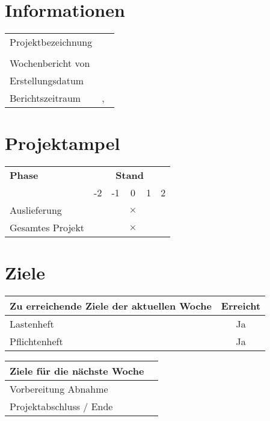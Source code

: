 
\section*{Informationen}

\begin{tabularx}{\textwidth}{lX}
\arrayrulecolor{OliveGreen}
\toprule[2pt]
Projektbezeichnung	         	& \projecttitle            	\\
         						& 								\\ \midrule
Wochenbericht von				& \writer                     			\\ \midrule
Erstellungsdatum				& \datum                             		\\ \midrule
Berichtszeitraum				& \berichtsdatum,~\KW							\\
\bottomrule[2pt]
\end{tabularx}

\section*{Projektampel}

\begin{tabularx}{\textwidth}{Xccccc}
\arrayrulecolor{OliveGreen}
\toprule
{\bfseries Phase} 	 & \multicolumn{5}{c}{\bfseries Stand} 			\\ 
\cmidrule(l){2-6}
				 &	-2             & -1                 & 0                       & 1                    & 2		\\
\midrule[2pt]
Auslieferung     & \cellcolor{red} & \cellcolor{red!40} & \cellcolor{green!10}	$\times$ & \cellcolor{green!40} & \cellcolor{green}      \\ \midrule
Gesamtes Projekt & \cellcolor{red} & \cellcolor{red!40} & \cellcolor{green!10}	$\times$ & \cellcolor{green!40} & \cellcolor{green}      \\ 
\bottomrule[2pt]
\end{tabularx}

\section*{Ziele}

\begin{tabularx}{\textwidth}{Xc}
\arrayrulecolor{OliveGreen}
\toprule
{\bfseries Zu erreichende Ziele der aktuellen Woche} 							& {\bfseries Erreicht}  	\\ 
\midrule[2pt]
Lastenheft									&Ja		\\
\rowcolor{OliveGreen!15}
Pflichtenheft								&Ja		\\
\bottomrule[2pt]
\end{tabularx}
%
\vspace{1cm}
%
\begin{tabularx}{\textwidth}{Xc}
\arrayrulecolor{OliveGreen}
\toprule
{\bfseries Ziele für die nächste Woche} &		\\ 
\midrule[2pt]
Vorbereitung Abnahme			  &		\\
\rowcolor{OliveGreen!15}
Projektabschluss / Ende			  &		\\

\end{tabularx}

